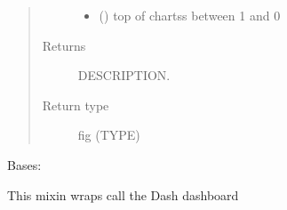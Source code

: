 \documentclass[letterpaper,10pt,english]{sphinxmanual}
\begin{document}
\begin{fulllineitems}
\begin{fulllineitems}
\begin{quote}
\begin{description}
\begin{itemize}
\item {} 
\sphinxAtStartPar
{} (\sphinxstyleliteralemphasis{\sphinxupquote{,}}) \textendash{} top of chartss between 1 and 0

\end{itemize}

\item[{Returns}] \leavevmode
\sphinxAtStartPar
DESCRIPTION.

\item[{Return type}] \leavevmode
\sphinxAtStartPar
fig (TYPE)

\end{description}\end{quote}

\end{fulllineitems}


\end{fulllineitems}


\begin{fulllineitems}
\label{\detokenize{core/modelclass:modelclass.Dash_Mixin}}
\pysigstartsignatures
{}
\pysigstopsignatures
\sphinxAtStartPar
Bases: 

\sphinxAtStartPar
This mixin wraps call the Dash dashboard

\begin{fulllineitems}
\label{\detokenize{core/modelclass:modelclass.Dash_Mixin.modeldash}}
\pysigstartsignatures
{}
\pysigstopsignatures
\end{fulllineitems}


\end{fulllineitems}

\end{document}
